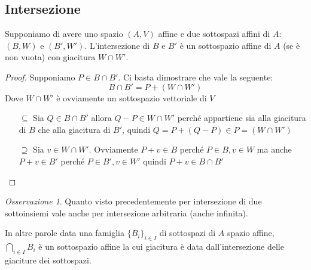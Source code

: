 \documentclass{article}
\newcounter{theo}[section]\setcounter{theo}{0}
\theoremstyle{plain}
\theoremstyle{definition}
\theoremstyle{remark}
\newtheorem*{remark}{Osservazione}
\begin{document}
\subsection{Intersezione}
Supponiamo di avere uno spazio \((A, V)\) affine e due sottospazi affini di
\(A\): \((B, W)\) e \((B', W')\). L'intersezione di \(B\) e \(B'\) è un
sottospazio affine di \(A\) (se è non vuota) con giacitura \(W \cap  W'\). 
\begin{proof}
    Supponiamo \(P \in  B \cap  B'\). Ci basta dimostrare che vale la seguente:
    \[
        B \cap B' = P + (W \cap  W')
    \]
    Dove \(W \cap  W'\) è ovviamente un sottospazio vettoriale di \(V\) 

    \begin{itemize}
        \item[\(\subseteq \)] Sia \(Q \in  B \cap B'\) allora \(Q - P \in W \cap
            W'\) perché appartiene sia alla giacitura di \(B\) che alla
            giacitura di \(B'\), quindi \(Q = P + (Q - P) \in P = (W \cap  W')\) 
        \item[\(\supseteq \)] Sia \(v \in  W \cap W'\). Ovviamente \(P+v \in B\)
            perché \(P \in B, v \in W\) ma anche \(P+v \in B'\) perché \(P \in
            B', v \in W'\) quindi \(P + v \in B \cap B'\) 
    \end{itemize}
\end{proof}
\begin{remark}
    Quanto visto precedentemente per intersezione di due sottoinsiemi vale anche
    per intersezione arbitraria (anche infinita).

    In altre parole data una famiglia
    \(\{B_{i}\}_{i \in I}\) di sottospazi di \(A\) spazio affine, \(\bigcap_{i
    \in  I} B_{i}\) è un sottospazio affine la cui giacitura è data
    dall'intersezione delle giaciture dei sottospazi.
\end{remark}
\end{document}
